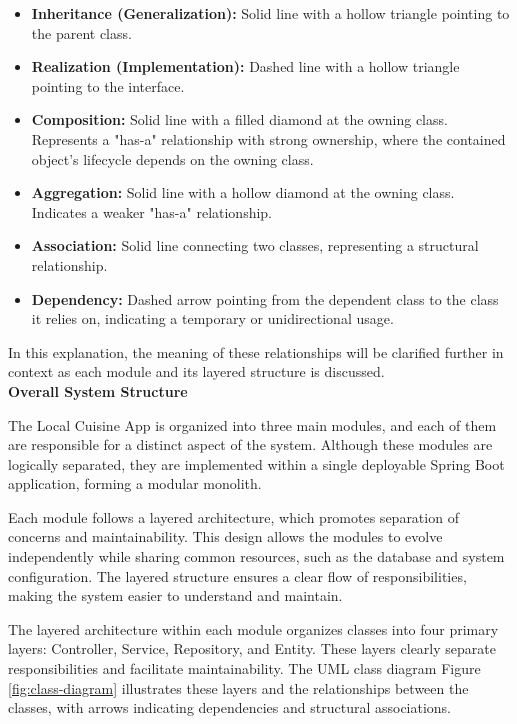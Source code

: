 \begin{itemize}
    \item \textbf{Inheritance (Generalization):}  Solid line with a hollow triangle pointing to the parent class.
    \item \textbf{Realization (Implementation):}  Dashed line with a hollow triangle pointing to the interface.
    \item \textbf{Composition:}  Solid line with a filled diamond at the owning class. Represents a "has-a" relationship with strong ownership, where the contained object’s lifecycle depends on the owning class.
    \item \textbf{Aggregation:}  Solid line with a hollow diamond at the owning class. Indicates a weaker "has-a" relationship.
    \item \textbf{Association:}  Solid line connecting two classes, representing a structural relationship.
    \item \textbf{Dependency:}  Dashed arrow pointing from the dependent class to the class it relies on, indicating a temporary or unidirectional usage.
\end{itemize}

In this explanation, the meaning of these relationships will be clarified further in context as each module and its layered structure is discussed.  \\


\noindent \textbf{Overall System Structure}


The Local Cuisine App is organized into three main modules, and each of them are responsible for a distinct aspect of the system.
Although these modules are logically separated, they are implemented within a single deployable Spring Boot application, forming a modular monolith. 

Each module follows a layered architecture, which promotes separation of concerns and maintainability.
This design allows the modules to evolve independently while sharing common resources,
such as the database and system configuration. The layered structure ensures a clear flow of responsibilities,
making the system easier to understand and maintain.

The layered architecture within each module organizes classes into four primary layers: Controller, Service, Repository, and Entity.
These layers clearly separate responsibilities and facilitate maintainability. The UML class diagram Figure \ref{fig:class-diagram} illustrates these layers and the relationships between the classes,
with arrows indicating dependencies and structural associations.  \\


